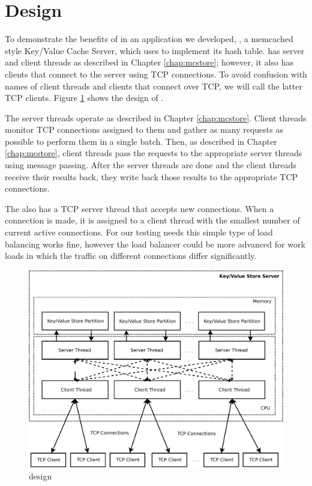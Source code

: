 \section{\cpserver{} Design}
\label{chap:cpserver}

To demonstrate the benefits of \cphash{} in an application we developed, \cpserver{}, a memcached style
Key/Value Cache Server, which uses \cphash{} to implement its hash table.
\cpserver{} has server and client threads as described in Chapter \ref{chap:mcstore}; however,
it also has clients that connect to the server using TCP connections. To avoid confusion with names of client threads and
clients that connect over TCP, we will call the latter TCP clients. Figure \ref{fig:mcserver} shows the design of \cpserver{}.

The server threads operate as described in Chapter \ref{chap:mcstore}. Client threads monitor TCP connections assigned to them 
and gather as many requests as possible to perform them in a single batch. Then, as described in Chapter \ref{chap:mcstore}, client threads pass the 
requests to the appropriate server threads using message passing. After the server threads are done and the client threads receive their results back, they write back 
those results to the appropriate TCP connections. 

The \cpserver{} also has a TCP server thread that accepts new connections. When a connection is made, 
it is assigned to a client thread with the smallest number of current active connections. For our testing needs this simple type of load balancing works fine, 
however the load balancer could be more advanced for work loads in which the traffic on different connections differ significantly.


\begin{figure}[!ht]
  \centering
  \includegraphics[width=\linewidth]{figs/mcserver.pdf}
  \caption{\cpserver{} design}
  \label{fig:mcserver}
\end{figure}

